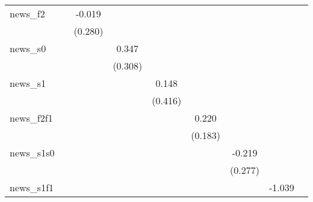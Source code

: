 {\begin{tabular}{l*{8}{c}}
\addlinespace
news\_f2     &                     &      -0.019         &                     &                     &                     &                     &                     &                     \\
            &                     &     (0.280)         &                     &                     &                     &                     &                     &                     \\
\addlinespace
news\_s0     &                     &                     &       0.347         &                     &                     &                     &                     &                     \\
            &                     &                     &     (0.308)         &                     &                     &                     &                     &                     \\
\addlinespace
news\_s1     &                     &                     &                     &       0.148         &                     &                     &                     &                     \\
            &                     &                     &                     &     (0.416)         &                     &                     &                     &                     \\
\addlinespace
news\_f2f1   &                     &                     &                     &                     &       0.220         &                     &                     &                     \\
            &                     &                     &                     &                     &     (0.183)         &                     &                     &                     \\
\addlinespace
news\_s1s0   &                     &                     &                     &                     &                     &      -0.219         &                     &                     \\
            &                     &                     &                     &                     &                     &     (0.277)         &                     &                     \\
\addlinespace
news\_s1f1   &                     &                     &                     &                     &                     &                     &      -1.039\sym{**} &                     \\

\end{tabular}}
